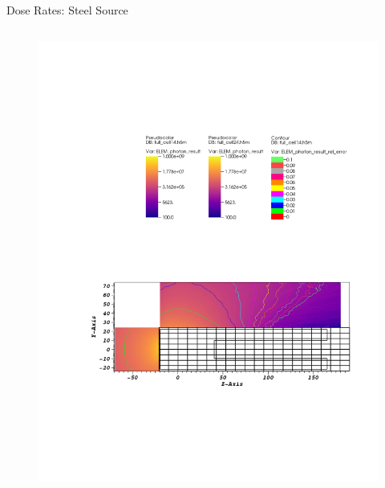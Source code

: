 \documentclass{beamer}
\begin{document}
\begin{frame}{Dose Rates: Steel Source}
\begin{columns}[T]
        \begin{figure}
                \includegraphics[scale=0.49,trim={6.75cm 16.5cm 11cm 6cm},clip]{figs/dose_steel_cell_novoid.pdf}
        \end{figure}
\end{columns}

\begin{columns}[T]


\end{columns}
\end{frame}
\end{document}

